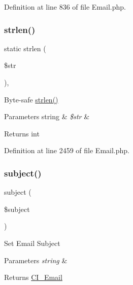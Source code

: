 Definition at line 836 of file Email.\+php.

\mbox{\label{class_c_i___email_a4c29a687d4ed62c26a10e41d98930d5f}} 
\subsubsection{\texorpdfstring{strlen()}{strlen()}}
{\footnotesize\ttfamily static strlen (\begin{DoxyParamCaption}\item[{}]{\$str }\end{DoxyParamCaption})\hspace{0.3cm}{\ttfamily [static]}, {\ttfamily [protected]}}

Byte-\/safe \mbox{\hyperlink{class_c_i___email_a4c29a687d4ed62c26a10e41d98930d5f}{strlen()}}


\begin{DoxyParams}[1]{Parameters}
string & {\em \$str} & \\
\hline
\end{DoxyParams}
\begin{DoxyReturn}{Returns}
int 
\end{DoxyReturn}


Definition at line 2459 of file Email.\+php.

\mbox{\label{class_c_i___email_aaa61b3aaa6cc4c90e26686e4bf41587a}} 
\subsubsection{\texorpdfstring{subject()}{subject()}}
{\footnotesize\ttfamily subject (\begin{DoxyParamCaption}\item[{}]{\$subject }\end{DoxyParamCaption})}

Set Email Subject


\begin{DoxyParams}{Parameters}
{\em string} & \\
\hline
\end{DoxyParams}
\begin{DoxyReturn}{Returns}
\mbox{\hyperlink{class_c_i___email}{C\+I\+\_\+\+Email}} 
\end{DoxyReturn}


